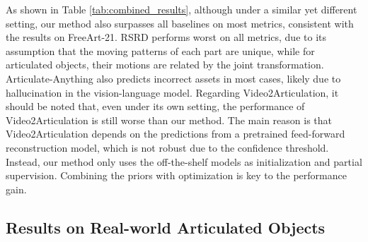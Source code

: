 As shown in Table \ref{tab:combined_results}, although under a similar yet different setting, our method also surpasses all baselines on most metrics, consistent with the results on FreeArt-21. RSRD performs worst on all metrics, due to its assumption that the moving patterns of each part are unique, while for articulated objects, their motions are related by the joint transformation. Articulate-Anything also predicts incorrect assets in most cases, likely due to hallucination in the vision-language model. Regarding Video2Articulation, it should be noted that, even under its own setting, the performance of Video2Articulation is still worse than our method. The main reason is that Video2Articulation depends on the predictions from a pretrained feed-forward reconstruction model, which is not robust due to the confidence threshold. Instead, our method only uses the off-the-shelf models as initialization and partial supervision. Combining the priors with optimization is key to the performance gain.

\subsection{Results on Real-world Articulated Objects}

\begin{table}[t]
    \centering
    \caption{Quantitative Results on Real-world Objects. The rotation and translation errors are clipped to $0.1^\circ$ and $0.1$ cm, respectively, which correspond to the smallest annotation units.}
   
    \label{tab:quantitative results of real}
    \renewcommand\tabcolsep{7pt}
\end{table}


